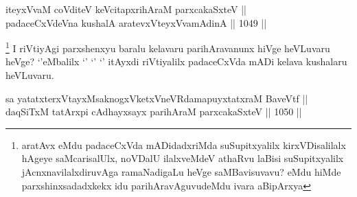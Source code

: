 \begin{shl}
iteyxVvaM coVditeV keVcitapxrihAraM parxcakaSxteV || \\
padaceCxVdeVna kushalA aratevxVteyxVvamAdinA ||  1049 ||  
\end{shl}

\begin{artha}
\footnote{aratAvx eMdu padaceCxVda mADidadxriMda suSupitxyalilx kirxVDisalilalx hAgeye saMcarisalUlx, noVDalU ilalxveMdeV athaRvu laBisi suSupitxyalilx jAcnxnavilalxdiruvAga ramaNadigaLu heVge saMBavisuvavu? eMdu hiMde parxshinxsadadxkekx idu parihAravAguvudeMdu ivara aBipArxya}
I riVtiyAgi parxshenxyu baralu kelavaru parihAravanunx hiVge heVLuvaru heVge? `\stext'eMbalilx `\stext' `\stext' `\stext' itAyxdi riVtiyalilx padaceCxVda mADi kelava kushalaru heVLuvaru.
\end{artha}

 
 \begin{shl}
sa yatatxterxVtayxMsaknogxVketxVneVRdamapuyxtatxraM BaveVtf || \\
daqSiTxM tatArxpi cAdhayxsayx parihAraM parxcakaSxteV ||  1050 ||  
\end{shl}
 
